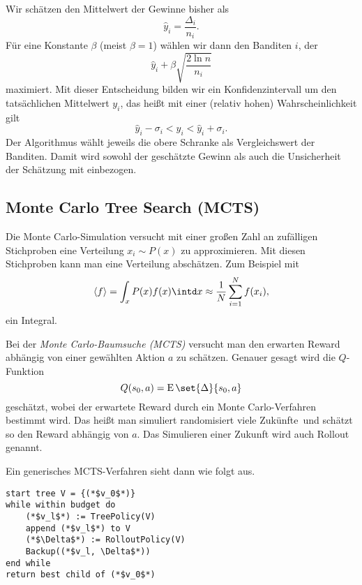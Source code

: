 \documentclass[ngerman]{../LaTeX-Templates/Paper/paper}
\newcommand{\E}{\ensuremath{\operatorname{E}}}
\begin{document}
Wir schätzen den Mittelwert der Gewinne bisher als
\begin{equation*}
	\hat y_i=\frac{\Delta_i}{n_i}.
\end{equation*}
Für eine Konstante $\beta$ (meist $\beta=1$) wählen wir dann den Banditen $i$, der
\begin{equation*}
	\hat y_i+\beta \sqrt{\frac{2\ln n}{n_i}}
\end{equation*}
maximiert. 
Mit dieser Entscheidung bilden wir ein Konfidenzintervall um den tatsächlichen Mittelwert $y_i$, das heißt mit einer (relativ hohen) Wahrscheinlichkeit gilt
\begin{equation*}
	\hat y_i-\sigma_i<y_i<\hat y_i+\sigma_i.
\end{equation*}
Der Algorithmus wählt jeweils die obere Schranke als Vergleichswert der Banditen. Damit wird sowohl der geschätzte Gewinn als auch die Unsicherheit der Schätzung mit einbezogen.


\subsection{Monte Carlo Tree Search (MCTS)}
Die Monte Carlo-Simulation versucht mit einer großen Zahl an zufälligen Stichproben eine Verteilung $x_i\sim P(x)$ zu approximieren. Mit diesen Stichproben kann man eine Verteilung abschätzen. Zum Beispiel mit 
\begin{equation*}
	\langle f\rangle=\int_xP(x)f(x)\intd x\approx \frac1N\sum_{i=1}^Nf(x_i),
\end{equation*}
ein Integral.

Bei der \emph{Monte Carlo-Baumsuche (MCTS)} versucht man den erwarten Reward abhängig von einer gewählten Aktion $a$ zu schätzen. Genauer gesagt wird die $Q$-Funktion 
\begin{equation*}
	Q(s_0,a)=\E\set{\Delta}{s_0,a}
\end{equation*}
geschätzt, wobei der erwartete Reward durch ein Monte Carlo-Verfahren bestimmt wird. Das heißt man simuliert randomisiert viele \glqq Zukünfte\grqq\ und schätzt so den Reward abhängig von $a$. Das Simulieren einer Zukunft wird auch Rollout genannt.

Ein generisches MCTS-Verfahren sieht dann wie folgt aus.
\begin{lstlisting}
start tree V = {(*$v_0$*)}
while within budget do
	(*$v_l$*) := TreePolicy(V)
	append (*$v_l$*) to V
	(*$\Delta$*) := RolloutPolicy(V)
	Backup((*$v_l, \Delta$*))
end while
return best child of (*$v_0$*)
\end{lstlisting}
\end{document}
